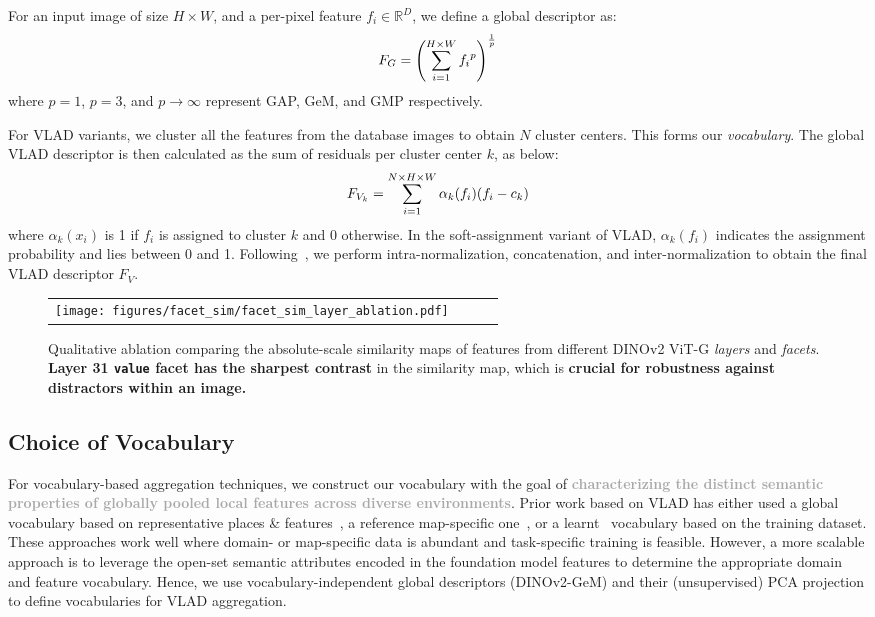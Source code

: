 \documentclass[letterpaper, 10 pt, conference]{ieeeconf}  \fi
\newcommand{\highlight}[1]{\textcolor{darkgray}{\textbf{#1}}}
\newcommand{\dinovtwo}{\mbox{DINOv2}}
\begin{document}
For an input image of size $H \times W$, and a per-pixel feature $f_i \in \mathbb{R}^D$,
we define a global descriptor as: 
\begin{equation}
\centering
F_{G} = \left(\sum_{i = 1}^{H \times W} {f_i}^{p}\right)^{\frac{1}{p}}
\end{equation}
where $p = 1$, $p = 3$, and $p \to \infty$ represent GAP, GeM, and GMP respectively.

For VLAD variants, we cluster all the features from the database images to obtain $N$ cluster centers. This forms our \emph{vocabulary}.
The global VLAD descriptor is then calculated as the sum of residuals per cluster center $k$, as below:
\begin{equation}
\centering
F_{V_k} = \sum_{i=1}^{N \times H \times W} \alpha_{k}(f_{i})(f_{i} - c_{k})
\end{equation}
where $\alpha_{k}(x_i)$ is 1 if $f_i$ is assigned to cluster $k$ and 0 otherwise. 
In the soft-assignment variant of VLAD, $\alpha_{k}(f_i)$ indicates the assignment probability and lies between 0 and 1. Following~\cite{arandjelovic2013all}, we perform intra-normalization, concatenation, and inter-normalization to obtain the final VLAD descriptor $F_V$.

\begin{figure}[!t]
\centering
\begin{tabular}{cccc}
\texttt{[image: figures/facet\_sim/facet\_sim\_layer\_ablation.pdf]} 
\end{tabular}
\caption{Qualitative ablation comparing the absolute-scale similarity maps of features from different \dinovtwo{} ViT-G \textit{layers} and \textit{facets}. \textbf{Layer 31 \textnormal{\texttt{value}} facet has the sharpest contrast} in the similarity map, which is \textbf{crucial for robustness against distractors within an image.}}
\label{fig:facet_sim_layer_ablation}
\end{figure}

\subsection{Choice of Vocabulary}
\label{sec:vocab_approach}

For vocabulary-based aggregation techniques, we construct our vocabulary with the goal of \highlight{characterizing the distinct semantic properties of globally pooled local features across diverse environments}.
Prior work based on VLAD has either used a global vocabulary based on representative places \& features~\cite{jegou2010aggregating}, a reference map-specific one~\cite{arandjelovic2013all}, or a learnt~\cite{arandjelovic2016netvlad} vocabulary based on the training dataset. 
These approaches work well where domain- or map-specific data is abundant and task-specific training is feasible. 
However, a more scalable approach is to leverage the open-set semantic attributes encoded in the foundation model features to determine the appropriate domain and feature vocabulary. 
Hence, we use vocabulary-independent global descriptors (DINOv2-GeM) and their (unsupervised) PCA projection to define vocabularies for VLAD aggregation.
\end{document}
